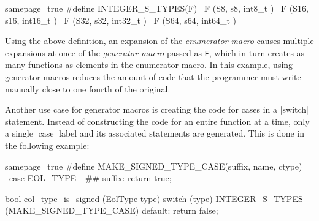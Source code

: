 \begin{ccode*}{samepage=true}
#define INTEGER_S_TYPES(F) \
    F (S8,  s8,  int8_t  ) \
    F (S16, s16, int16_t ) \
    F (S32, s32, int32_t ) \
    F (S64, s64, int64_t )
\end{ccode*}

\noindent Using the above definition, an expansion of the \emph{enumerator
macro} causes multiple expansions at once of the \emph{generator macro} passed
as \verb|F|, which in turn creates as many functions as elements in the
enumerator macro. In this example, using generator macros reduces the amount
of code that the programmer must write manually close to one fourth of the
original.

Another use case for generator macros is creating the code for cases in
a \Mc|switch| statement. Instead of constructing the code for an entire
function at a time, only a single \Mc|case| label and its associated
statements are generated. This is done in the following example:

\begin{ccode*}{samepage=true}
#define MAKE_SIGNED_TYPE_CASE(suffix, name, ctype) \
    case EOL_TYPE_ ## suffix: return true;

bool eol_type_is_signed (EolType type) {
  switch (type) {
    INTEGER_S_TYPES (MAKE_SIGNED_TYPE_CASE)
    default: return false;
  }
}
\end{ccode*}

